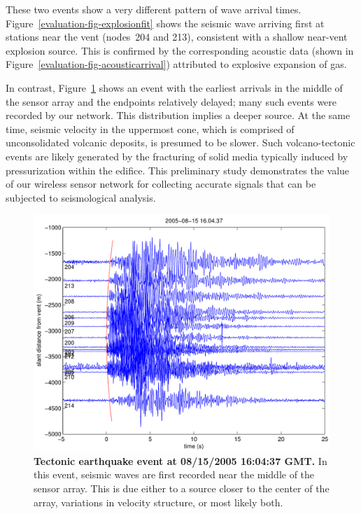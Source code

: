 \vfill\eject

These two events show a very different pattern of wave arrival times.
Figure~\ref{evaluation-fig-explosionfit} shows the seismic wave arriving
first at stations near the vent (nodes~204 and 213), consistent with a
shallow near-vent explosion source. This is confirmed by the corresponding
acoustic data (shown in Figure~\ref{evaluation-fig-acousticarrival})
attributed to explosive expansion of gas.

In contrast, Figure~\ref{evaluation-fig-tectonicfit} shows an event with the
earliest arrivals in the middle of the sensor array and the endpoints
relatively delayed; many such events were recorded by our network. This
distribution implies a deeper source. At the same time, seismic velocity in
the uppermost cone, which is comprised of unconsolidated volcanic deposits,
is presumed to be slower. Such volcano-tectonic events are likely generated
by the fracturing of solid media typically induced by pressurization within
the edifice. This preliminary study demonstrates the value of our wireless
sensor network for collecting accurate signals that can be subjected to
seismological analysis.

\begin{figure}[t!]
\begin{center}
\includegraphics[width=0.8\hsize]{./3-evaluation/figs/tectonicfit.pdf}
\end{center}

\caption{\textbf{Tectonic earthquake event at 08/15/2005 16:04:37 GMT.} In
this event, seismic waves are first recorded near the middle of the sensor
array. This is due either to a source closer to the center of the array,
variations in velocity structure, or most likely both.}

\label{evaluation-fig-tectonicfit}
\end{figure}

